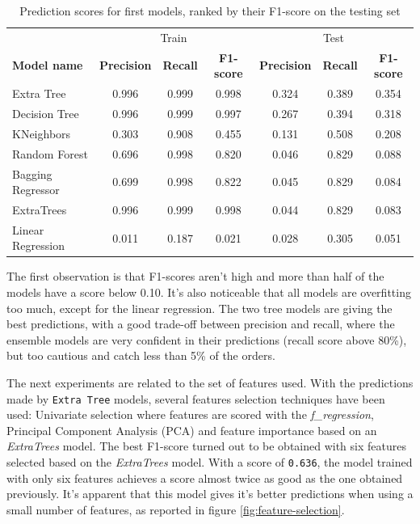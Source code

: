 \begin{table}[htb]
    \begin{tabular}{l|ccc|ccc}
                          & \multicolumn{3}{c|}{Train}                         & \multicolumn{3}{c}{Test}      \\
        \textbf{Model name}        & \textbf{Precision} & \textbf{Recall} & \textbf{F1-score} & \textbf{Precision} & \textbf{Recall} & \textbf{F1-score} \\ \hline
        Extra Tree        & 0.996     & 0.999  & 0.998                         & 0.324     & 0.389  & 0.354    \\
        Decision Tree     & 0.996     & 0.999  & 0.997                         & 0.267     & 0.394  & 0.318   \\
        KNeighbors        & 0.303     & 0.908  & 0.455                         & 0.131     & 0.508  & 0.208    \\
        Random Forest     & 0.696     & 0.998  & 0.820                         & 0.046     & 0.829  & 0.088    \\
        Bagging Regressor & 0.699     & 0.998  & 0.822                         & 0.045     & 0.829  & 0.084    \\
        ExtraTrees        & 0.996     & 0.999  & 0.998                         & 0.044     & 0.829  & 0.083    \\
        Linear Regression & 0.011     & 0.187  & 0.021                         & 0.028     & 0.305  & 0.051    
    \end{tabular}
    \caption{Prediction scores for first models, ranked by their F1-score on the testing set}
    \label{tab:scores-simple-models}
\end{table}

The first observation is that F1-scores aren't high and more than half of the models have a score below 0.10. It's also noticeable that all models are overfitting too much, except for the linear regression. The two tree models are giving the best predictions, with a good trade-off between precision and recall, where the ensemble models are very confident in their predictions (recall score above 80\%), but too cautious and catch less than 5\% of the orders.

The next experiments are related to the set of features used. With the predictions made by \texttt{Extra Tree} models, several features selection techniques have been used: Univariate selection where features are scored with the \textit{f\_regression}, Principal Component Analysis (PCA) and feature importance based on an \textit{ExtraTrees} model. The best F1-score turned out to be obtained with six features selected based on the \textit{ExtraTrees} model. With a score of \texttt{0.636}, the model trained with only six features achieves a score almost twice as good as the one obtained previously. It's apparent that this model gives it's better predictions when using a small number of features, as reported in figure \ref{fig:feature-selection}.

